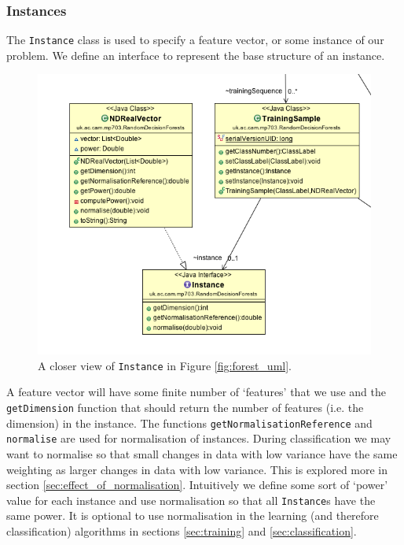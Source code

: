 \documentclass[12pt,twoside,notitlepage]{report}
\begin{document}
            \subsubsection{Instances}
                The \texttt{Instance} class is used to specify a feature vector, or some instance of our problem. We 
                define an interface to represent the base structure of an instance. 

                \begin{figure}[H]
                    \centering
                    \includegraphics[scale=0.5]{Instance_Forest_UML}
                    \caption{A closer view of \texttt{Instance} in Figure \ref{fig:forest_uml}.}
                    \label{fig:instance_uml}
                \end{figure}

                A feature vector will have some finite number of `features' that we use and the \texttt{getDimension} 
                function that should return the number of features (i.e. the dimension) in the instance. The functions 
                \texttt{getNormalisationReference} and \texttt{normalise} are used for normalisation of instances. 
                During classification we may want to normalise so that small changes in data with low variance have 
                the same weighting as larger changes in data with low variance. This is explored more in section 
                \ref{sec:effect_of_normalisation}. Intuitively we define some sort of `power' value for each instance 
                and use normalisation so that all \texttt{Instance}s have the same power. It is optional to use 
                normalisation in the learning (and therefore classification) algorithms in sections \ref{sec:training} 
                and \ref{sec:classification}. 
\end{document}
